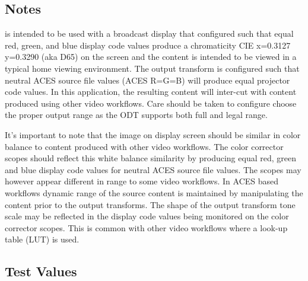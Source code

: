 \subsection{Notes}
\label{subsec:notes-\id}

is intended to be used with a broadcast display that configured such that equal red, green, and blue display code values produce a chromaticity CIE x=0.3127 y=0.3290 (aka D65) on the screen and the content is intended to be viewed in a typical home viewing environment. The output transform is configured such that neutral ACES source file values (ACES R=G=B) will produce equal projector code values. In this application, the resulting content will inter-cut with content produced using other video workflows.  Care should be taken to configure choose the proper output range as the ODT supports both full and legal range.

It's important to note that the image on display screen should be similar in color balance to content produced with other video workflows. The color corrector scopes should reflect this white balance similarity by producing equal red, green and blue display code values for neutral ACES source file values. The scopes may however appear different in range to some video workflows.  In ACES based workflows dynamic range of the source content is maintained by manipulating the content prior to the output transforms.  The shape of the output transform tone scale may be reflected in the display code values being monitored on the color corrector scopes.  This is common with other video workflows where a look-up table (LUT) is used.

\subsection{Test Values}
\label{subsec:testValues-\id}

\testValuesSubSec{}



